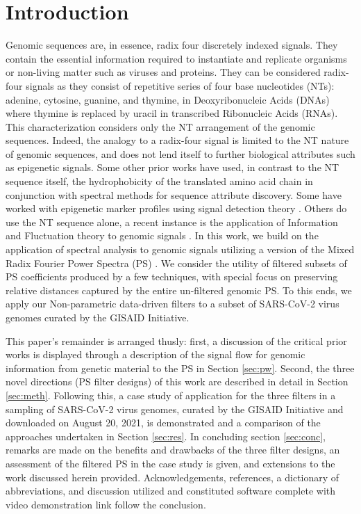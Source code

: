 \documentclass[10pt,conference]{IEEEtran}
\begin{document}
\IEEEpeerreviewmaketitle

\section{Introduction}
\label{sec:int}

\noindent Genomic sequences are, in essence, radix four discretely indexed signals.
They contain the essential information required to instantiate and replicate organisms
or non-living matter such as viruses and proteins.
They can be considered radix-four signals as they consist of repetitive series of four base nucleotides (NTs): 
adenine, cytosine, guanine, and thymine, in Deoxyribonucleic Acids (DNAs) where thymine is replaced by uracil in transcribed Ribonucleic 
Acids (RNAs). 
This characterization considers only the NT arrangement of the genomic sequences.
Indeed, the analogy to a radix-four signal is limited to the NT nature of genomic sequences, and does not lend itself to further biological 
attributes such as epigenetic signals.  
Some other prior works have used, in contrast to the NT sequence itself, the hydrophobicity of the translated 
amino acid chain in conjunction with spectral methods for sequence attribute discovery. \cite{Shu17} 
Some have worked with epigenetic marker profiles using signal detection theory \cite{San19}.
Others do use the NT sequence alone, a recent instance is the application of  Information and Fluctuation theory to genomic signals
\cite{Dem14}.  
In this work, we build on the application of spectral analysis to genomic signals utilizing a version of the Mixed Radix Fourier Power Spectra 
(PS) \cite{Sin69}.
We consider the utility of filtered subsets of PS coefficients produced by a few techniques, with special focus on preserving relative distances 
captured by the entire un-filtered genomic PS. 
To this ends, we apply our Non-parametric data-driven filters to a subset of SARS-CoV-2 virus genomes curated by the GISAID \cite{gisaid} 
Initiative. 

This paper's remainder is arranged thusly: first, a discussion of the critical prior works is displayed through a description of the signal flow for 
genomic information from genetic material to the PS in Section \ref{sec:pw}.  Second, the three novel directions (PS filter designs) of this work 
are described in detail in Section \ref{sec:meth}. Following this, a case study of application for the three filters in a sampling of SARS-CoV-2 
virus genomes, curated by the GISAID Initiative and downloaded on August 20, 2021, is demonstrated and a comparison of the  approaches 
undertaken in Section \ref{sec:res}. In concluding section \ref{sec:conc}, remarks are made on the benefits and drawbacks of the three filter designs, an 
assessment of the filtered PS in the case study is given, and extensions to the work discussed herein provided.  
Acknowledgements, references, a dictionary of abbreviations, and discussion utilized and constituted software complete with video demonstration link follow the conclusion.
\end{document}
